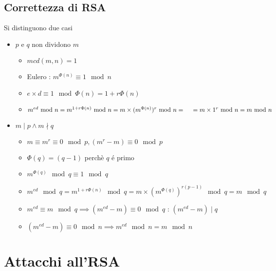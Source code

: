 \subsection{Correttezza di RSA}

Si distinguono due casi

\begin{itemize}
    \item $p$ e $q$ non dividono $m$
    \begin{itemize}
        \item $mcd(m, n) = 1$
        \item Eulero : $m^{\Phi(n)} \equiv 1 \mod{n}$
        \item $e \times d \equiv 1 \mod{\Phi(n)} = 1 + r\Phi(n)$
        \item $m^{ed} \mod{n} = m^{1+r\Phi(n)} \mod{n} = m \times (m^{\Phi(n)})^r \mod{n} =\\\quad= m \times 1^r \mod{n} = m \mod{n}$
    \end{itemize}
    \item $m \mid p \wedge m \nmid q$
    \begin{itemize}
        \item $m \equiv m^r \equiv 0 \mod{p}, (m^r - m) \equiv 0 \mod{p}$
        \item $\Phi(q) = (q-1)$ perch\`e $q$ \'e primo
        \item $m^{\Phi(q)} \mod{q} \equiv 1 \mod{q}$
        \item $m^{ed} \mod{q} = m^{1+r\Phi(n)} \mod{q} = m \times (m^{\Phi(q)})^{r(p-1)} \mod{q} = m \mod{q}$
        \item $m^{ed} \equiv m \mod{q} \implies (m^{ed} - m) \equiv 0 \mod{q}$ : $(m^{ed} - m) \mid q$
        \item $(m^{ed} - m) \equiv 0 \mod{n} \implies m^{ed} \mod{n} = m \mod{n}$
    \end{itemize}
\end{itemize}

\section{Attacchi all'RSA}

